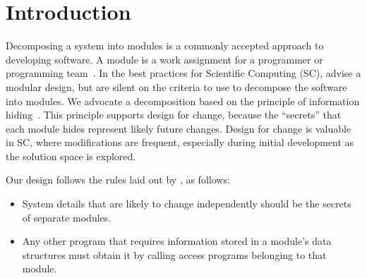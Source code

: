 \documentclass[12pt, titlepage]{article}
\begin{document}


\newpage

\tableofcontents

\listoftables

\listoffigures

\newpage


\section{Introduction}

\hspace{3ex}Decomposing a system into modules is a commonly accepted
approach to developing software.  A module is a work assignment for a
programmer or programming team~\citep{ParnasEtAl1984}.  In the best
practices for Scientific Computing (SC), \citet{WilsonEtAl2013} advise a
modular design, but are silent on the criteria to use to decompose the
software into modules.  We advocate a decomposition based on the
principle of information hiding~\citep{Parnas1972a}.  This principle
supports design for change, because the ``secrets'' that each module
hides represent likely future changes.  Design for change is valuable
in SC, where modifications are frequent, especially during initial
development as the solution space is explored.

Our design follows the rules laid out by \citet{ParnasEtAl1984}, as follows:
\begin{itemize}  
\item System details that are likely to change independently should be
  the secrets of separate modules.
\item Any other program that requires information stored in a module's
  data structures must obtain it by calling access programs belonging
  to that module.
\end{itemize}


\end{document}
